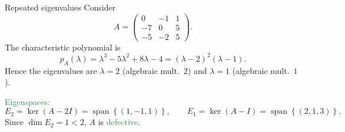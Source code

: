 \documentclass{beamer}
\begin{document}
\begin{frame}{Repeated eigenvalues}
Consider
\[
A=\begin{pmatrix}
0&-1&1\\
-7&0&5\\
-5&-2&5
\end{pmatrix}.
\]
The characteristic polynomial is
\[
p_A(\lambda)=\lambda^3-5\lambda^2+8\lambda-4=(\lambda-2)^2(\lambda-1).
\]
Hence the eigenvalues are $\lambda=2$ (algebraic mult.\ $2$) and $\lambda=1$ (algebraic mult.\ $1$).
\medskip

\textcolor{SeaGreen}{Eigenspaces:}
\[
E_{2}=\ker(A-2I)=\operatorname{span}\!\left\{(1,-1,1)\right\}, 
\qquad
E_{1}=\ker(A-I)=\operatorname{span}\!\left\{(2,1,3)\right\}.
\]
Since $\dim E_{2}=1<2$, $A$ is \textcolor{SeaGreen}{defective}.
\end{frame}



\end{document}

